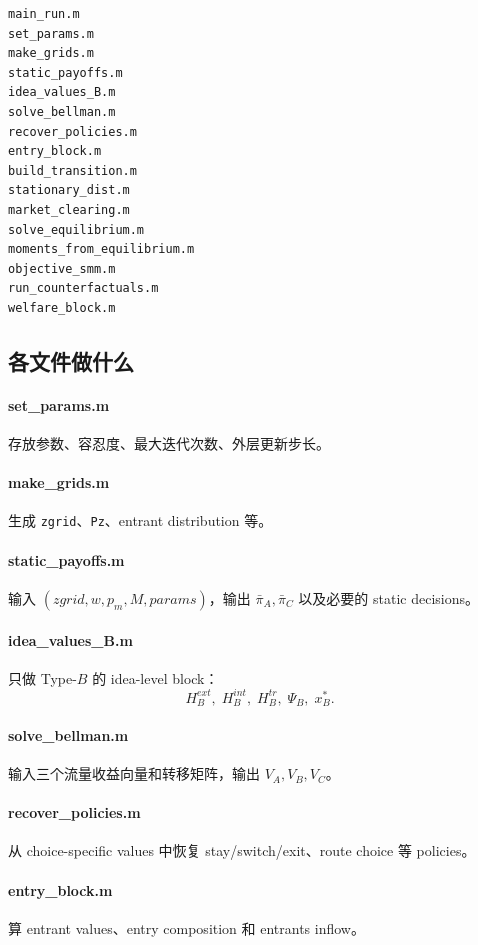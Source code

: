 \documentclass[12pt]{ctexart}
\begin{document}
\begin{verbatim}
main_run.m
set_params.m
make_grids.m
static_payoffs.m
idea_values_B.m
solve_bellman.m
recover_policies.m
entry_block.m
build_transition.m
stationary_dist.m
market_clearing.m
solve_equilibrium.m
moments_from_equilibrium.m
objective_smm.m
run_counterfactuals.m
welfare_block.m
\end{verbatim}

\subsection{各文件做什么}

\paragraph{set\_params.m}
存放参数、容忍度、最大迭代次数、外层更新步长。

\paragraph{make\_grids.m}
生成 \texttt{zgrid}、\texttt{Pz}、entrant distribution 等。

\paragraph{static\_payoffs.m}
输入 $(zgrid,w,p_m,M,params)$，输出 $\bar\pi_A,\bar\pi_C$ 以及必要的 static decisions。

\paragraph{idea\_values\_B.m}
只做 Type-$B$ 的 idea-level block：
\[
H_B^{ext},\;H_B^{int},\;H_B^{tr},\;\Psi_B,\;x_B^*.
\]

\paragraph{solve\_bellman.m}
输入三个流量收益向量和转移矩阵，输出 $V_A,V_B,V_C$。

\paragraph{recover\_policies.m}
从 choice-specific values 中恢复 stay/switch/exit、route choice 等 policies。

\paragraph{entry\_block.m}
算 entrant values、entry composition 和 entrants inflow。
\end{document}
